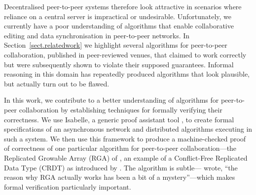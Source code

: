 \documentclass[acmlarge,review,anonymous]{acmart}\settopmatter{printfolios=true}
\begin{document}
Decentralised peer-to-peer systems therefore look attractive in scenarios where reliance on a
central server is impractical or undesirable. Unfortunately, we currently have a poor understanding
of algorithms that enable collaborative editing and data synchronisation in peer-to-peer networks.
In Section~\ref{sect.relatedwork} we highlight several algorithms for peer-to-peer collaboration,
published in peer-reviewed venues, that claimed to work correctly but were subsequently shown to violate
their supposed guarantees. Informal reasoning in this domain has repeatedly produced algorithms that
look plausible, but actually turn out to be flawed.

In this work, we contribute to a better understanding of algorithms for peer-to-peer collaboration
by establishing techniques for formally verifying their correctness. We use Isabelle, a generic
proof assistant tool \cite{DBLP:conf/tphol/WenzelPN08}, to create formal specifications of an
asynchronous network and distributed algorithms executing in such a system. We then use this
framework to produce a machine-checked proof of correctness of one particular algorithm for
peer-to-peer collaboration---the Replicated Growable Array (RGA) of \citet{Roh:2011dw}, an example
of a Conflict-Free Replicated Data Type (CRDT) as introduced by
\citet{Shapiro:2011wy,Shapiro:2011un}.
The algorithm is subtle---\citet{Attiya:2016kh} wrote, ``the reason why RGA actually works has been
a bit of a mystery''---which makes formal verification particularly important.

%
%
%
\end{document}
